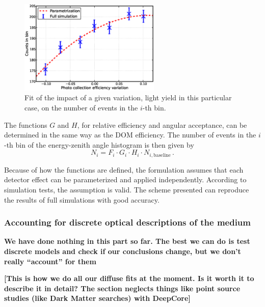 \documentclass[../Main.tex]{subfiles}
\begin{document}
\begin{figure}[h]
 \centering
 \includegraphics[width=0.6\textwidth]{DOMparam}
 \caption[Parametrization of discrete simulation sets.]{Fit of the impact of a given variation, light yield in this particular case, on the number of events in the $i$-th bin.}
 \label{fig:sys_discrete}
\end{figure}

The functions $G$ and $H$, for relative efficiency and angular acceptance, can be determined in the same way as the DOM efficiency. The number of events in the $i$-th bin of the energy-zenith angle histogram is then given by
\begin{equation}
N_i = F_i \cdot G_i\cdot H_i \cdot N_{i,\mathrm{baseline}}\,.
\end{equation}

Because of how the functions are defined, the formulation assumes that each detector effect can be parameterized and applied independently. According to simulation tests, the assumption is valid. The scheme presented can reproduce the results of full simulations with good accuracy.


\subsubsection{Accounting for discrete optical descriptions of the medium}
\textbf{We have done nothing in this part so far. The best we can do is test discrete models and check if our conclusions change, but we don't really ``account'' for them}

\textbf{[This is how we do all our diffuse fits at the moment. Is it worth it to describe it in detail? The section neglects things like point source studies (like Dark Matter searches) with DeepCore]}
\end{document}
